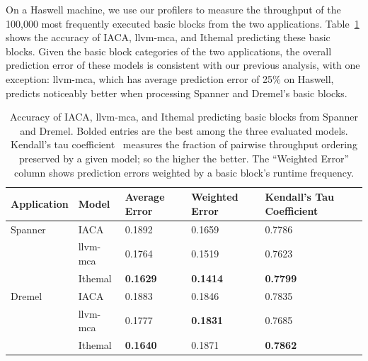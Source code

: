 On a Haswell machine, we use our profilers
to measure the throughput of the 100,000 most frequently executed  basic blocks
from the two applications. Table~\ref{tab:google-numbers} shows the accuracy
of IACA, llvm-mca, and Ithemal predicting these basic blocks.
Given the basic block categories of the 
two applications,
the overall prediction error of these models is consistent with our previous analysis,
with one exception:
llvm-mca, which has average prediction error of 25\% on Haswell, predicts noticeably better
when processing Spanner and Dremel's basic blocks.

\begin{table}[h]
\begin{tabular}
{|p{}|p{}|p{}|p{}|p{}|}
\hline

\textbf{Application} & \textbf{Model} &
\textbf{Average Error} & \textbf{Weighted Error} & \textbf{Kendall's Tau Coefficient} \\
\hline

Spanner & IACA & 0.1892 & 0.1659 & 0.7786\\
    & llvm-mca & 0.1764 & 0.1519 & 0.7623\\
    & Ithemal & \textbf{0.1629} & \textbf{0.1414} & \textbf{0.7799}\\
\hline

Dremel & IACA & 0.1883 & 0.1846 & 0.7835\\
    & llvm-mca & 0.1777 & \textbf{0.1831} & 0.7685\\
    & Ithemal & \textbf{0.1640} & 0.1871 & \textbf{0.7862}\\

\hline
\end{tabular}
\\
\caption{Accuracy of IACA, llvm-mca, and Ithemal predicting basic blocks from Spanner and Dremel.
Bolded entries are the best among the three evaluated models.
Kendall's tau coefficient~\cite{kendalltau}
measures the fraction of pairwise throughput ordering preserved by a given model;
so the higher the better.
The ``Weighted Error'' column shows prediction errors weighted by a basic block's runtime frequency.}
\label{tab:google-numbers}
\end{table}